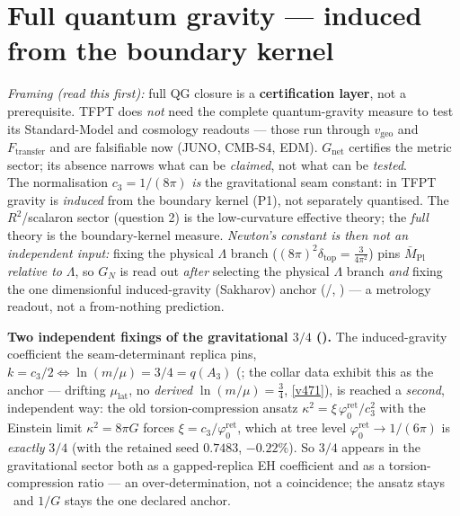 \documentclass[11pt,a4paper]{article}
\newcommand{\phiz}{\varphi_0^{\mathrm{ret}}}
\newcommand{\cthree}{c_3}
\begin{document}
\section{Full quantum gravity --- induced from the boundary kernel}
\emph{Framing (read this first):} full QG closure is a \textbf{certification layer}, not a prerequisite.
TFPT does \emph{not} need the complete quantum-gravity measure to test its Standard-Model and cosmology
readouts --- those run through $v_{\mathrm{geo}}$ and $F_{\mathrm{transfer}}$ and are falsifiable now
(JUNO, CMB-S4, EDM). $G_{\mathrm{net}}$ certifies the metric sector; its absence narrows what can be
\emph{claimed}, not what can be \emph{tested}.
\smallskip\\
The normalisation $\cthree=1/(8\pi)$ \emph{is} the gravitational seam constant: in TFPT gravity is
\emph{induced} from the boundary kernel (P1), not separately quantised. The $R^2$/scalaron sector
(question 2) is the low-curvature effective theory; the \emph{full} theory is the boundary-kernel measure.
\emph{Newton's constant is then not an \emph{independent} input:} fixing the physical $\Lambda$ branch
($(8\pi)^2\delta_{\mathrm{top}}=\tfrac{3}{4\pi^2}$) pins $\bar M_{\mathrm{Pl}}$ \emph{relative to} $\Lambda$, so
$G_N$ is read out \emph{after} selecting the physical $\Lambda$ branch \emph{and} fixing the one dimensionful
induced-gravity (Sakharov) anchor (\mE/\mC, ) --- a metrology readout,
not a from-nothing prediction.

\par\smallskip\noindent\textbf{Two independent fixings of the gravitational $3/4$
().} The induced-gravity coefficient the seam-determinant replica pins,
$k=\cthree/2\Leftrightarrow\ln(m/\mu)=3/4=q(A_3)$ (; the collar data
exhibit this as the anchor --- drifting $\mu_{\mathrm{lat}}$, no \emph{derived} $\ln(m/\mu){=}\tfrac34$,
\vref{v471}), is reached a \emph{second}, independent way: the old torsion-compression ansatz $\kappa^2=\xi\,\phiz/\cthree^2$ with the
Einstein limit $\kappa^2=8\pi G$ forces $\xi=\cthree/\phiz$, which at tree level $\phiz\!\to\!1/(6\pi)$ is
\emph{exactly} $3/4$ (with the retained seed $0.7483$, $-0.22\%$). So $3/4$ appears in the gravitational
sector both as a gapped-replica EH coefficient and as a torsion-compression ratio --- an over-determination,
not a coincidence; the ansatz stays \mC\ and $1/G$ stays the one declared anchor.
\end{document}
